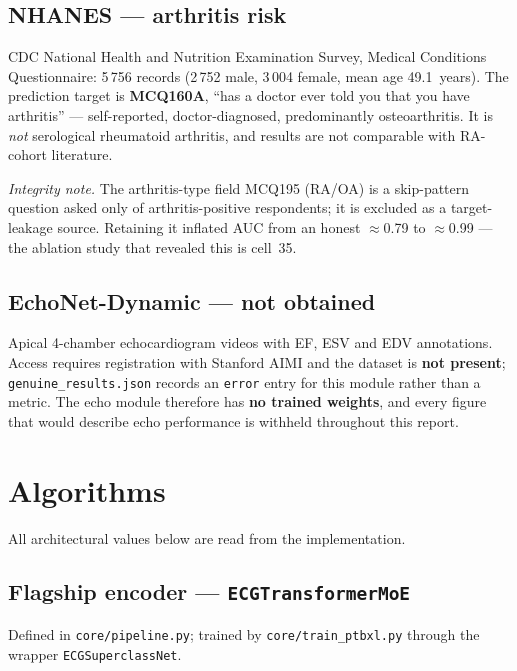 \documentclass[11pt,a4paper]{article}
\newcommand{\code}[1]{\texttt{\small #1}}
\begin{document}
\subsection{NHANES --- arthritis risk}

CDC National Health and Nutrition Examination Survey, Medical Conditions
Questionnaire: 5\,756 records (2\,752 male, 3\,004 female, mean age
49.1~years). The prediction target is \textbf{MCQ160A}, ``has a doctor ever
told you that you have arthritis'' --- self-reported, doctor-diagnosed,
predominantly osteoarthritis. It is \emph{not} serological rheumatoid
arthritis, and results are not comparable with RA-cohort literature.

\emph{Integrity note.} The arthritis-type field MCQ195 (RA/OA) is a
skip-pattern question asked only of arthritis-positive respondents; it is
excluded as a target-leakage source. Retaining it inflated AUC from an
honest $\approx$0.79 to $\approx$0.99 --- the ablation study
that revealed this is cell~35.

\subsection{EchoNet-Dynamic --- not obtained}

Apical 4-chamber echocardiogram videos with EF, ESV and EDV annotations.
Access requires registration with Stanford AIMI and the dataset is
\textbf{not present}; \code{genuine\_results.json} records an \code{error}
entry for this module rather than a metric. The echo module therefore has
\textbf{no trained weights}, and every figure that would describe echo
performance is withheld throughout this report.

\section{Algorithms}
\label{sec:algo}

All architectural values below are read from the implementation.

\subsection{Flagship encoder --- \texorpdfstring{\code{ECGTransformerMoE}}{ECGTransformerMoE}}

Defined in \code{core/pipeline.py}; trained by \code{core/train\_ptbxl.py}
through the wrapper \code{ECGSuperclassNet}.
\end{document}
